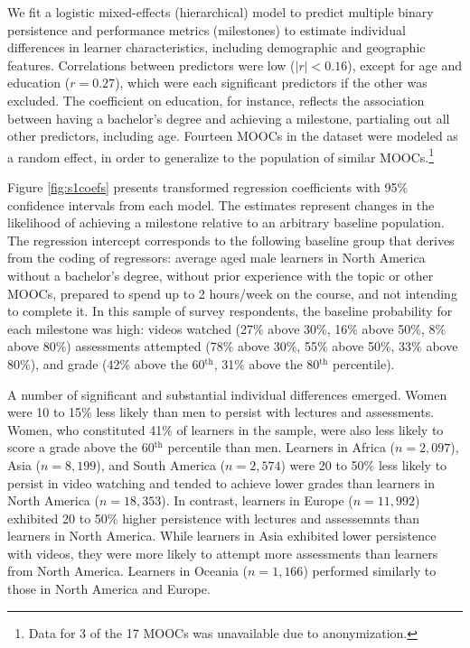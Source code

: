 \documentclass{sigchi}\usepackage[]{graphicx}\usepackage[]{color}
\begin{document}
We fit a logistic mixed-effects (hierarchical) model to predict multiple binary persistence and performance metrics (milestones) to estimate individual differences in learner characteristics, including demographic and geographic features. Correlations between predictors were low ($|r|<0.16$), except for age and education ($r=0.27$), which were each significant predictors if the other was excluded. The coefficient on education, for instance, reflects the association between having a bachelor's degree and achieving a milestone, partialing out all other predictors, including age. Fourteen MOOCs in the dataset were modeled as a random effect, in order to generalize to the population of similar MOOCs.\footnote{Data for 3 of the 17 MOOCs was unavailable due to anonymization.} 

Figure \ref{fig:s1coefs} presents transformed regression coefficients with 95\% confidence intervals from each model. The estimates represent changes in the likelihood of achieving a milestone relative to an arbitrary baseline population. The regression intercept corresponds to the following baseline group that derives from the coding of regressors: average aged male learners in North America without a bachelor's degree, without prior experience with the topic or other MOOCs, prepared to spend up to 2 hours/week on the course, and not intending to complete it. In this sample of survey respondents, the baseline probability for each milestone was high: videos watched (27\% above 30\%, 16\% above 50\%, 8\% above 80\%) assessments attempted (78\% above 30\%, 55\% above 50\%, 33\% above 80\%), and grade (42\% above the 60$^\text{th}$, 31\% above the 80$^\text{th}$ percentile).

A number of significant and substantial individual differences emerged. Women were 10 to 15\% less likely than men to persist with lectures and assessments. Women, who constituted 41\% of learners in the sample, were also less likely to score a grade above the 60$^\text{th}$ percentile than men. Learners in Africa ($n = 2,097$), Asia ($n = 8,199$), and South America ($n = 2,574$) were 20 to 50\% less likely to persist in video watching and tended to achieve lower grades than learners in North America ($n = 18,353$). In contrast, learners in Europe ($n = 11,992$) exhibited 20 to 50\% higher persistence with lectures and assessemnts than learners in North America. While learners in Asia exhibited lower persistence with videos, they were more likely to attempt more assessments than learners from North America. Learners in Oceania ($n = 1,166$) performed similarly to those in North America and Europe. 
\end{document}
